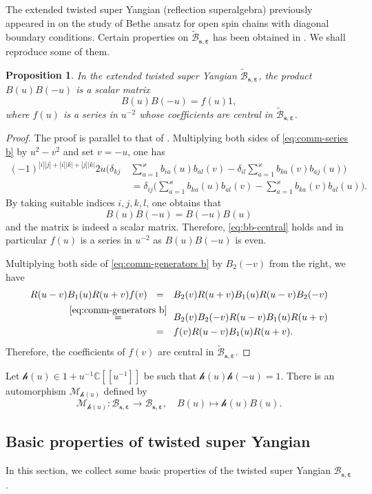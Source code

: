 \documentclass[11pt,reqno]{amsart}
\numberwithin{equation}{section}
\newtheorem{prop}[thm]{Proposition}
\theoremstyle{definition}
\theoremstyle{remark}
\newcommand{\beq}{\begin{equation}}
\newcommand{\eeq}{\end{equation}}
\newcommand{\C}{\mathbb{C}}
\newcommand{\mc}{\mathcal}
\newcommand{\BMN}{{\mathscr{B}_{\bm s,\bm \ve}}}
\newcommand{\ka}{\varkappa}
\newcommand{\ve}{\varepsilon}
\begin{document}
The extended twisted super Yangian (reflection superalgebra) previously appeared in \cite{Ragoucy2007analytical,Belliard2009nested} on the study of Bethe ansatz for open spin chains with diagonal boundary conditions. Certain properties on $\widetilde{\mathscr B}_{\bm s,\bm\ve}$ has been obtained in \cite{Ragoucy2007analytical,Belliard2009nested}. We shall reproduce some of them.

\begin{prop}
In the extended twisted super Yangian $\widetilde{\mathscr B}_{\bm s,\bm\ve}$, the product $B(u)B(-u)$ is a scalar matrix
\beq\label{eq:bb-central}
B(u)B(-u)=f(u)1,
\eeq
where $f(u)$ is a series in $u^{-2}$ whose coefficients are central in $\widetilde{\mathscr B}_{\bm s,\bm\ve}$.
\end{prop}
\begin{proof}
The proof is parallel to that of \cite[Proposition 2.1]{Molev2002reflection}. Multiplying both sides of \eqref{eq:comm-series b} by $u^2-v^2$ and set $v=-u$, one has
\beq
\begin{split}
(-1)^{|i||j|+|i||k|+|j||k|} 2u\Big(\delta_{kj} &\ \sum_{a=1}^\ka b_{ia}(u)b_{al}(v)-\delta_{il}\sum_{a=1}^\ka b_{ka}(v)b_{aj}(u)\Big)\\
&\ = \delta_{ij}\Big(\sum_{a=1}^\ka b_{ka}(u)b_{al}(v)-\sum_{a=1}^\ka b_{ka}(v)b_{al}(u)\Big).
\end{split}
\eeq
By taking suitable indices $i,j,k,l$, one obtains that
$$
B(u)B(-u)=B(-u)B(u)
$$
and the matrix is indeed a scalar matrix. Therefore, \eqref{eq:bb-central} holds and in particular $f(u)$ is a series in $u^{-2}$ as $B(u)B(-u)$ is even.

Multiplying both side of \eqref{eq:comm-generators b} by $B_2(-v)$ from the right, we have
\begin{align*}
R(u-v)B_1(u)R(u+v)f(v)\  \ =\ \ &\ B_2(v)R(u+v)B_1(u)R(u-v)B_2(-v)\\
\stackrel{\eqref{eq:comm-generators b}}{=}\ & \  B_2(v)B_2(-v)R(u-v)B_1(u)R(u+v)\\
=\ \  &\ f(v)R(u-v)B_1(u)R(u+v).
\end{align*}
Therefore, the coefficients of $f(v)$ are central in $\widetilde{\mathscr B}_{\bm s,\bm\ve}$.
\end{proof}

Let $\mc h(u)\in1+u^{-1}\C[[u^{-1}]]$ be such that $\mc h(u)\mc h(-u)=1$. There is an automorphism $\mc M_{\mc h(u)}$ defined by
\beq\label{mhu}
\mc M_{\mc h(u)}:\BMN\to \BMN,\quad B(u)\mapsto \mc h(u)B(u).
\eeq

\subsection{Basic properties of twisted super Yangian}\label{sec:properties}
In this section, we collect some basic properties of the twisted super Yangian $\mathscr B_{\bm s,\bm\ve}$.
\end{document}
